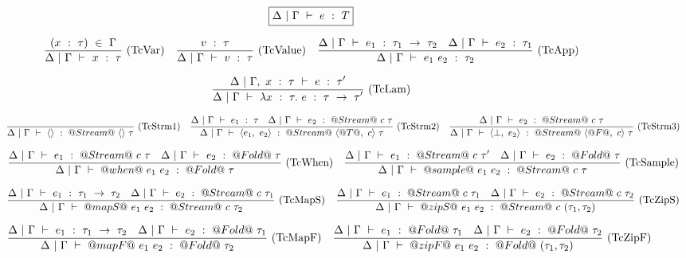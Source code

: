 \begin{figure*}

$$
\boxed{\Delta~|~\Gamma ~\vdash~ e~:~T}
$$


$$
\enskip \frac {\displaystyle 
    (x~:~\tau)~\in~\Gamma
} {\displaystyle  
    \Delta~|~\Gamma ~\vdash~ x~:~\tau
} \  \mbox{(TcVar)} \enskip
\enskip \frac {\displaystyle 
    v~:~\tau
} {\displaystyle  
    \Delta~|~\Gamma ~\vdash~ v~:~\tau
} \  \mbox{(TcValue)} \enskip
\enskip \frac {\displaystyle 
    \Delta~|~\Gamma ~\vdash~ e_1~:~\tau_1~\to~\tau_2
    \quad
    \Delta~|~\Gamma ~\vdash~ e_2~:~\tau_1
} {\displaystyle  
    \Delta~|~\Gamma ~\vdash~ e_1~e_2~:~\tau_2
} \  \mbox{(TcApp)} \enskip
$$

$$
\enskip \frac {\displaystyle 
    \Delta~|~\Gamma,~x~:~\tau ~\vdash~ e~:~\tau'
} {\displaystyle 
    \Delta~|~\Gamma ~\vdash~ \lambda{}x~:~\tau.~e~:~\tau~\to~\tau'
} \  \mbox{(TcLam)} \enskip
$$

$$
\enskip \frac {\displaystyle } {\displaystyle 
    \Delta~|~\Gamma ~\vdash~ \langle \rangle~:~@Stream@~\langle\rangle~\tau
} \  \mbox{(TcStrm1)} \enskip
\enskip \frac {\displaystyle 
    \Delta~|~\Gamma ~\vdash~ e_1~:~\tau
    \quad
    \Delta~|~\Gamma ~\vdash~ e_2~:~@Stream@~c~\tau
} {\displaystyle 
    \Delta~|~\Gamma ~\vdash~ \langle e_1,~e_2 \rangle~:~@Stream@~\langle @T@,~c \rangle~\tau
} \  \mbox{(TcStrm2)} \enskip
\enskip \frac {\displaystyle 
    \Delta~|~\Gamma ~\vdash~ e_2~:~@Stream@~c~\tau
} {\displaystyle 
    \Delta~|~\Gamma ~\vdash~ \langle \bot,~e_2 \rangle~:~@Stream@~\langle @F@,~c \rangle~\tau
} \  \mbox{(TcStrm3)} \enskip
$$

$$
\enskip \frac {\displaystyle 
    \Delta~|~\Gamma ~\vdash~ e_1~:~@Stream@~c~\tau
    \quad
    \Delta~|~\Gamma ~\vdash~ e_2~:~@Fold@~\tau
} {\displaystyle 
    \Delta~|~\Gamma ~\vdash~ @when@~e_1~e_2~:~@Fold@~\tau
} \  \mbox{(TcWhen)} \enskip
\enskip \frac {\displaystyle 
    \Delta~|~\Gamma ~\vdash~ e_1~:~@Stream@~c~\tau'
    \quad
    \Delta~|~\Gamma ~\vdash~ e_2~:~@Fold@~\tau
} {\displaystyle 
    \Delta~|~\Gamma ~\vdash~ @sample@~e_1~e_2~:~@Stream@~c~\tau
} \  \mbox{(TcSample)} \enskip
$$

$$
\enskip \frac {\displaystyle 
    \Delta~|~\Gamma ~\vdash~ e_1~:~\tau_1~\to~\tau_2
    \quad
    \Delta~|~\Gamma ~\vdash~ e_2~:~@Stream@~c~\tau_1
} {\displaystyle 
    \Delta~|~\Gamma ~\vdash~ @mapS@~e_1~e_2~:~@Stream@~c~\tau_2
} \  \mbox{(TcMapS)} \enskip
\enskip \frac {\displaystyle 
    \Delta~|~\Gamma ~\vdash~ e_1~:~@Stream@~c~\tau_1
    \quad
    \Delta~|~\Gamma ~\vdash~ e_2~:~@Stream@~c~\tau_2
} {\displaystyle 
    \Delta~|~\Gamma ~\vdash~ @zipS@~e_1~e_2~:~@Stream@~c~(\tau_1,\tau_2)
} \  \mbox{(TcZipS)} \enskip
$$

$$
\enskip \frac {\displaystyle 
    \Delta~|~\Gamma ~\vdash~ e_1~:~\tau_1~\to~\tau_2
    \quad
    \Delta~|~\Gamma ~\vdash~ e_2~:~@Fold@~\tau_1
} {\displaystyle 
    \Delta~|~\Gamma ~\vdash~ @mapF@~e_1~e_2~:~@Fold@~\tau_2
} \  \mbox{(TcMapF)} \enskip
\enskip \frac {\displaystyle 
    \Delta~|~\Gamma ~\vdash~ e_1~:~@Fold@~\tau_1
    \quad
    \Delta~|~\Gamma ~\vdash~ e_2~:~@Fold@~\tau_2
} {\displaystyle 
    \Delta~|~\Gamma ~\vdash~ @zipF@~e_1~e_2~:~@Fold@~(\tau_1,\tau_2)
} \  \mbox{(TcZipF)} \enskip
$$


\end{figure*}
